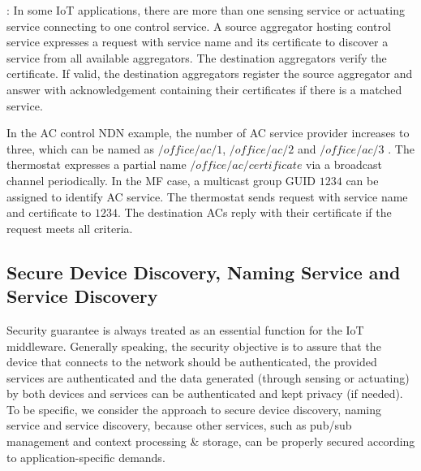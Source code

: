 \vspace{1mm}: In some IoT applications, there are more than one sensing service or actuating service connecting to one control service. A source aggregator hosting control service expresses a request with service name and its certificate to discover a service from all  available aggregators. The destination aggregators verify the certificate. If valid, the destination aggregators register the source aggregator and  answer with acknowledgement containing their certificates if there is a matched service.

In the AC control NDN example, the number of AC service provider increases to three, which can be named as $/office/ac/1$, $/office/ac/2$ and $/office/ac/3$ . The thermostat expresses a partial name $/office/ac/certificate$ via a broadcast channel periodically. In the MF case, a multicast group GUID $1234$ can be assigned to identify AC service. The thermostat sends request with service name and certificate to $1234$. The destination ACs reply with their certificate if the request meets all criteria.

\subsection{Secure Device Discovery, Naming Service and Service Discovery}
Security guarantee is always treated as an essential function for the IoT middleware. Generally speaking, the security objective is to assure that the device that connects to the network should be authenticated, the provided services are authenticated and the data generated (through sensing or actuating) by both devices and services can be authenticated and kept privacy (if needed). To be specific, we consider the approach to secure device discovery, naming service and service discovery, because other services, such as pub/sub management and context processing \& storage, can be properly secured according to application-specific demands.
 
